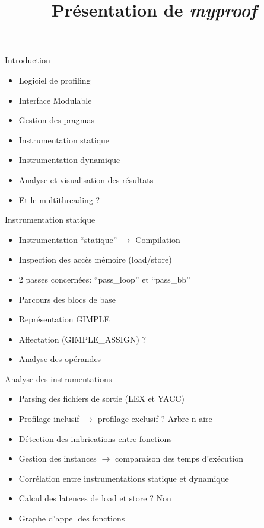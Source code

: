 \documentclass{beamer}
\title[Outil de profiling \emph{myproof}]{Présentation de \emph{myproof}}
\begin{document}
\begin{frame}
\titlepage
\end{frame}

\begin{frame}{Introduction}
  \begin{itemize}
  \item Logiciel de profiling
  \item Interface Modulable
  \item Gestion des pragmas
  \item Instrumentation statique
  \item Instrumentation dynamique
  \item Analyse et visualisation des résultats
  \item Et le multithreading ?
  \end{itemize}
\end{frame}

\begin{frame}{Instrumentation statique}
  \begin{itemize}
  \item Instrumentation ``statique'' $\rightarrow$ Compilation
  \item Inspection des accès mémoire (load/store)
  \item 2 passes concernées: ``pass\_loop'' et ``pass\_bb''
  \item Parcours des blocs de base
  \item Représentation GIMPLE
  \item Affectation (GIMPLE\_ASSIGN) ?
  \item Analyse des opérandes
  \end{itemize}
\end{frame}

\begin{frame}{Analyse des instrumentations}
  \begin{itemize}
  \item Parsing des fichiers de sortie (LEX et YACC)
  \item Profilage inclusif $\rightarrow$ profilage exclusif ? Arbre n-aire
  \item Détection des imbrications entre fonctions
  \item Gestion des instances $\rightarrow$ comparaison des temps d'exécution
  \item Corrélation entre instrumentations statique et dynamique
  \item Calcul des latences de load et store ? Non
  \item Graphe d'appel des fonctions
  \end{itemize}
\end{frame}
\end{document}
